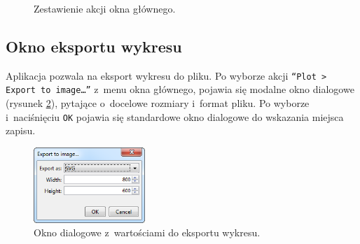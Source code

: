 \documentclass[10pt,a4paper]{article}
\newcommand{\prog}[1]{\texttt{#1}}
\begin{document}
\begin{figure}[h]
  \centering
  \hspace{0.1\textwidth}
  \caption{Zestawienie akcji okna głównego.}
  \label{fig:menu}
\end{figure}

\subsection{Okno eksportu wykresu}

Aplikacja pozwala na eksport wykresu do pliku. Po wyborze akcji \prog{``Plot >
Export to image\ldots''} z~menu okna głównego, pojawia się modalne okno
dialogowe (rysunek \ref{fig:eksport-wykresu}), pytające o~docelowe rozmiary
i~format pliku. Po wyborze i~naciśnięciu \prog{OK} pojawia się standardowe okno
dialogowe do wskazania miejsca zapisu.

\begin{figure}[h]
  \centering
  \includegraphics[width=0.374\textwidth]{images/eksport-wykresu}
  \caption{Okno dialogowe z~wartościami do eksportu wykresu.}
  \label{fig:eksport-wykresu}
\end{figure}
\end{document}
